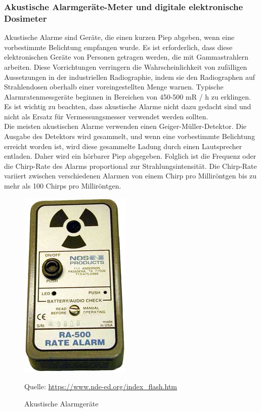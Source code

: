 {\subsubsection{Akustische Alarmgeräte-Meter und digitale elektronische Dosimeter}
Akustische Alarme sind Geräte, die einen kurzen Piep abgeben, wenn eine vorbestimmte Belichtung empfangen wurde.
Es ist erforderlich, dass diese elektronischen Geräte von Personen getragen werden, die mit Gammastrahlern arbeiten. Diese Vorrichtungen verringern die Wahrscheinlichkeit von zufälligen Aussetzungen in der industriellen Radiographie, indem sie den Radiographen auf Strahlendosen oberhalb einer voreingestellten Menge warnen. Typische Alarmratenmessgeräte beginnen in Bereichen von 450-500 mR / h zu erklingen. Es ist wichtig zu beachten, dass akustische Alarme nicht dazu gedacht sind und nicht als Ersatz für Vermessungsmesser verwendet werden sollten.\\
Die meisten akustischen Alarme verwenden einen Geiger-Müller-Detektor. Die Ausgabe des Detektors wird gesammelt, und wenn eine vorbestimmte Belichtung erreicht worden ist, wird diese gesammelte Ladung durch einen Lautsprecher entladen. Daher wird ein hörbarer Piep abgegeben. Folglich ist die Frequenz oder die Chirp-Rate des Alarms proportional zur Strahlungsintensität. Die Chirp-Rate variiert zwischen verschiedenen Alarmen von einem Chirp pro Milliröntgen bis zu mehr als 100 Chirps pro Milliröntgen.
\begin{figure}[htb]
\centering
   \includegraphics[scale=0.3]{img/alarm.jpg}\\
  \caption{Akustische Alarmgeräte}
  \label{fig:Alarmgeräte Meter}
  Quelle: \url{https://www.nde-ed.org/index_flash.htm}
\end{figure}
}
